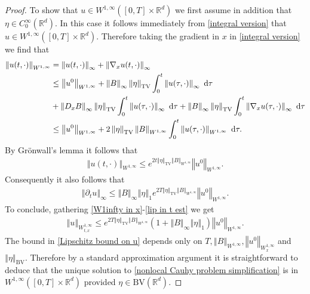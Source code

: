 \documentclass[11pt,reqno]{amsart}
\numberwithin{equation}{section}
\def\dd{{\rm d}}
\begin{document}
\begin{proof}
To show that $u\in W^{1,\infty}([0,T]\times \mathbb{R}^{d})$ we first assume in addition that $\eta\in C^{\infty}_{0}(\mathbb{R}^{d})$. In this case it follows  immediately from \eqref{integral version} that $u\in W^{1,\infty}([0,T]\times \mathbb{R}^
{d})$. Therefore taking the gradient in $x$ in \eqref{integral version} we find that 
\begin{align*}
\left\Vert u(t,\cdot)\right\Vert_{W^{1,\infty}}&=\left\Vert u(t,\cdot)\right\Vert_{\infty} +\left\Vert \nabla_{x}u(t,\cdot)\right\Vert_{\infty}\\
&\leq \left\Vert u^
{0}\right\Vert_{W^{1,\infty}}+\left\Vert B\right\Vert_{\infty}\left\Vert \eta\right\Vert_{\mathrm{TV}} \int_{0}^{t}\left\Vert u(\tau,\cdot)\right\Vert_{\infty}\ \dd \tau   \\&+\left\Vert D_{x}B\right\Vert_{\infty}\left\Vert \eta\right\Vert_{\mathrm{TV}}\int_{0}^{t}\left\Vert u(\tau,\cdot)\right\Vert_{\infty}\ \dd \tau
+\left\Vert B\right\Vert_{\infty}\left\Vert \eta\right\Vert_{\mathrm{TV}}\int_{0}^{t}\left\Vert \nabla_{x}u(\tau,\cdot)\right\Vert_{\infty}\ \dd \tau\\
&\leq \left\Vert u^{0}\right\Vert_{W^{1,\infty}}+2\left\Vert \eta\right\Vert_{\mathrm{TV}}\left\Vert B\right\Vert_{W^{1,\infty}}\int_{0}^{t}\left\Vert u(\tau,\cdot)\right\Vert_{W^{1,\infty}}\ \dd \tau.   
\end{align*}
By Gr\"onwall's lemma it follows that 
\begin{align}
\left\Vert u(t,\cdot)\right\Vert_{W^{1,\infty}}\leq e^{2t\left\Vert \eta\right\Vert_{\mathrm{TV}}\left\Vert B\right\Vert_{W^{1,\infty}} }\left\Vert u^{0}\right\Vert_{W^{1,\infty}}.\label{W1infty in x}       
\end{align}
Consequently it also follows that 
\begin{align}
\left\Vert \partial_{t}u\right\Vert_{\infty}\leq \left\Vert B\right\Vert_{\infty}\left\Vert \eta\right\Vert_{1}e^{2T\left\Vert \eta\right\Vert_{\mathrm{TV}}\left\Vert B\right\Vert_{W^{1,\infty}} }\left\Vert u^{0}\right\Vert_{W^{1,\infty}}. \label{lip in t est}       
\end{align}
To conclude, gathering \eqref{W1infty in x}-\eqref{lip in t est} we get 
\begin{align}
\left\Vert u\right\Vert_{W^{1,\infty}_{t,x}}\leq e^{2T\left\Vert \eta\right\Vert_{\mathrm{TV}}\left\Vert B\right\Vert_{W^{1,\infty}}  }(1+\left\Vert B\right\Vert_{\infty}\left\Vert \eta\right\Vert_{1})\left\Vert u^{0}\right\Vert_{W^{1,\infty}}.\label{Lipschitz bound on u}      \end{align}
The bound in \eqref{Lipschitz bound on u} depends only on $T,\left\Vert B\right\Vert_{W^{1,\infty}},\left\Vert u^{0}\right\Vert_{W^{1,\infty}_{x}}$ and $\left\Vert \eta\right\Vert_{\mathrm{BV}} $. Therefore by a standard approximation argument it is straightforward to deduce that the unique solution to \eqref{nonlocal Cauhy problem simplification} is in  $W^{1,\infty}([0,T]\times \mathbb{R}^{d})$ provided $\eta\in \mathrm{BV}(\mathbb{R}^{d})$.
\end{proof}
\end{document}
